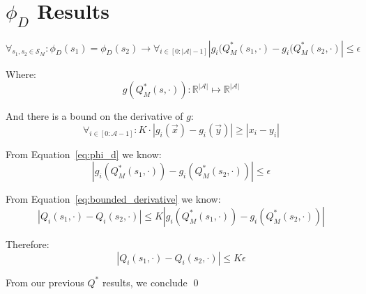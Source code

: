 \documentclass[11pt]{amsart}
\begin{document}
\section{$\phi_{D}$ Results}

\begin{equation}
\forall_{s_1, s_2 \in \mathcal{S}_M} : \phi_D(s_1) = \phi_D(s_2) \rightarrow \forall_{i \in [0:|\mathcal{A}| - 1]} | g_i(Q_M^*(s_1, \cdot) - g_i(Q_M^*(s_2, \cdot) | \leq \epsilon
\label{eq:phi_d}
\end{equation}

Where:
\begin{equation}
g(Q_M^*(s,\cdot)) : \mathbb{R}^{|\mathcal{A}|} \longmapsto \mathbb{R}^{|\mathcal{A}|}
\end{equation}

And there is a bound on the derivative of $g$:
\begin{equation}
\forall_{i \in [0:\mathcal{A}-1]} : K \cdot |g_i(\vec{x}) - g_i(\vec{y})| \geq |x_i - y_i |
\label{eq:bounded_derivative}
\end{equation}

From Equation~\ref{eq:phi_d} we know:
\begin{equation}
|g_i(Q_M^*(s_1,\cdot)) - g_i(Q_M^*(s_2,\cdot))| \leq \epsilon
\end{equation}

From Equation~\ref{eq:bounded_derivative} we know:
\begin{equation}
|Q_i(s_1,\cdot) - Q_i(s_2,\cdot)| \leq K |g_i(Q_M^*(s_1,\cdot)) - g_i(Q_M^*(s_2,\cdot))|
\end{equation}

Therefore:
\begin{equation}
|Q_i(s_1,\cdot) - Q_i(s_2,\cdot)| \leq K \epsilon
\end{equation}

From our previous $Q^*$ results, we conclude \qed
\end{document}

